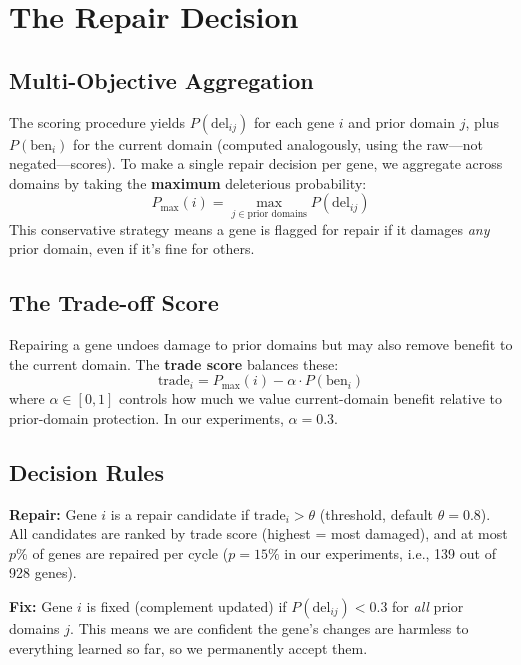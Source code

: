 \documentclass[11pt,letterpaper]{article}
\theoremstyle{definition}
\begin{document}
\section{The Repair Decision}
\label{sec:decision}

\subsection{Multi-Objective Aggregation}

The scoring procedure yields $P(\text{del}_{ij})$ for each gene $i$ and prior domain $j$, plus $P(\text{ben}_i)$ for the current domain (computed analogously, using the raw---not negated---scores). To make a single repair decision per gene, we aggregate across domains by taking the \textbf{maximum} deleterious probability:
\[
P_{\max}(i) = \max_{j \in \text{prior domains}} P(\text{del}_{ij})
\]
This conservative strategy means a gene is flagged for repair if it damages \emph{any} prior domain, even if it's fine for others.

\subsection{The Trade-off Score}

Repairing a gene undoes damage to prior domains but may also remove benefit to the current domain. The \textbf{trade score} balances these:
\begin{equation}
\text{trade}_i = P_{\max}(i) - \alpha \cdot P(\text{ben}_i)
\label{eq:trade}
\end{equation}
where $\alpha \in [0, 1]$ controls how much we value current-domain benefit relative to prior-domain protection. In our experiments, $\alpha = 0.3$.

\subsection{Decision Rules}

\textbf{Repair:} Gene $i$ is a repair candidate if $\text{trade}_i > \theta$ (threshold, default $\theta = 0.8$). All candidates are ranked by trade score (highest = most damaged), and at most $p\%$ of genes are repaired per cycle ($p = 15\%$ in our experiments, i.e., 139 out of 928 genes).

\textbf{Fix:} Gene $i$ is fixed (complement updated) if $P(\text{del}_{ij}) < 0.3$ for \emph{all} prior domains $j$. This means we are confident the gene's changes are harmless to everything learned so far, so we permanently accept them.
\end{document}
